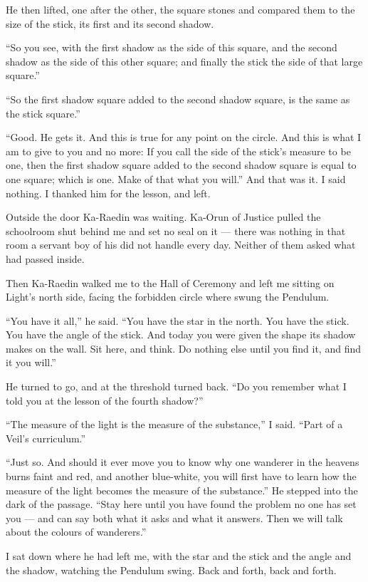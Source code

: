He then lifted, one after the other, the square stones and compared them to the size of the stick, its first and its second shadow.

``So you see, with the first shadow as the side of this square, and the second shadow as the side of this other square; and finally the stick the side of that large square.''

``So the first shadow square added to the second shadow square, is the same as the stick square.''

``Good. He gets it. And this is true for any point on the circle. And this is what I am to give to you and no more: If you call the side of the stick's measure to be one, then the first shadow square added to the second shadow square is equal to one square; which is one. Make of that what you will.'' And that was it. I said nothing. I thanked him for the lesson, and left.\par

Outside the door Ka-Raedin was waiting. Ka-Orun of Justice pulled the schoolroom shut behind me and set no seal on it --- there was nothing in that room a servant boy of his did not handle every day. Neither of them asked what had passed inside.\par

Then Ka-Raedin walked me to the Hall of Ceremony and left me sitting on Light's north side, facing the forbidden circle where swung the Pendulum.\par

``You have it all,'' he said. ``You have the star in the north. You have the stick. You have the angle of the stick. And today you were given the shape its shadow makes on the wall. Sit here, and think. Do nothing else until you find it, and find it you will.''\par

He turned to go, and at the threshold turned back. ``Do you remember what I told you at the lesson of the fourth shadow?''\par

``The measure of the light is the measure of the substance,'' I said. ``Part of a Veil's curriculum.''\par

``Just so. And should it ever move you to know why one wanderer in the heavens burns faint and red, and another blue-white, you will first have to learn how the measure of the light becomes the measure of the substance.'' He stepped into the dark of the passage. ``Stay here until you have found the problem no one has set you --- and can say both what it asks and what it answers. Then we will talk about the colours of wanderers.''\par

I sat down where he had left me, with the star and the stick and the angle and the shadow, watching the Pendulum swing. Back and forth, back and forth.\par